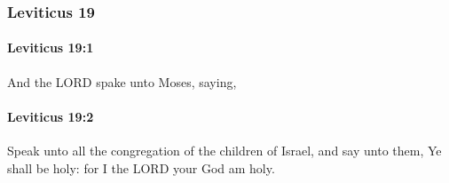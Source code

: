	\subsubsection{Leviticus 19} %
		\label{LEVITICUS-19}

		\paragraph{Leviticus 19:1} %
			\label{LEVITICUS-19-1}

			And the LORD spake unto Moses, saying,


		\paragraph{Leviticus 19:2} %
			\label{LEVITICUS-19-2}

			Speak unto all the congregation of the children of Israel, and say unto them, Ye shall be holy: for I the LORD your God am holy.

